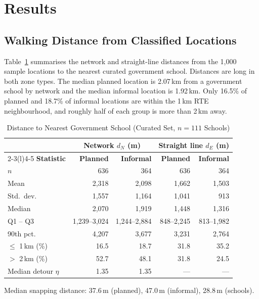 \documentclass[conference]{IEEEtran}
\newcommand{\km}{\,km}
\newcommand{\m}{\,m}
\begin{document}
\section{Results}\label{sec:results}
\subsection{Walking Distance from Classified Locations}
Table~\ref{tab:desc} summarises the network and straight-line distances from the 1,000 sample locations to the nearest curated government school. Distances are long in both zone types. The median planned location is 2.07\km{} from a government school by network and the median informal location is 1.92\km{}. Only 16.5\% of planned and 18.7\% of informal locations are within the 1\km{} RTE neighbourhood, and roughly half of each group is more than 2\km{} away.

\begin{table}[!t]
\centering
\caption{Distance to Nearest Government School (Curated Set, $n=111$ Schools)}
\label{tab:desc}
\footnotesize
\begin{threeparttable}
\begin{tabular}{@{}lrrrr@{}}
\toprule
& \multicolumn{2}{c}{\textbf{Network $d_N$ (m)}} & \multicolumn{2}{c}{\textbf{Straight line $d_E$ (m)}} \\
\cmidrule(lr){2-3}\cmidrule(l){4-5}
\textbf{Statistic} & \textbf{Planned} & \textbf{Informal} & \textbf{Planned} & \textbf{Informal} \\
\midrule
$n$ & 636 & 364 & 636 & 364 \\
Mean & 2,318 & 2,098 & 1,662 & 1,503 \\
Std.\ dev. & 1,557 & 1,164 & 1,041 & 913 \\
Median & 2,070 & 1,919 & 1,448 & 1,316 \\
Q1 -- Q3 & 1,239--3,024 & 1,244--2,884 & 848--2,245 & 813--1,982 \\
90th pct. & 4,207 & 3,677 & 3,231 & 2,764 \\
$\le$ 1\km{} (\%) & 16.5 & 18.7 & 31.8 & 35.2 \\
$>$ 2\km{} (\%) & 52.7 & 48.1 & 31.8 & 24.5 \\
Median detour $\eta$ & 1.35 & 1.35 & --- & --- \\
\bottomrule
\end{tabular}
\begin{tablenotes}\footnotesize
\item Median snapping distance: 37.6\m{} (planned), 47.0\m{} (informal), 28.8\m{} (schools).
\end{tablenotes}
\end{threeparttable}
\end{table}
\end{document}

